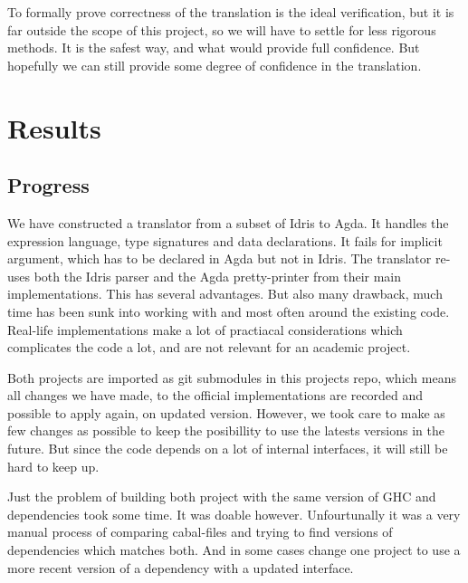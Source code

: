 \documentclass[parskip=half]{scrartcl}
\begin{document}
To formally prove correctness of the translation is the ideal verification, but
it is far outside the scope of this project, so we will have to settle for less
rigorous methods. It is the safest way, and what would provide full confidence.
But hopefully we can still provide some degree of confidence in the
translation.


\section{Results}
\subsection{Progress}

We have constructed a translator from a subset of Idris to Agda. It handles the
expression language, type signatures and data declarations.  It fails for
implicit argument, which has to be declared in Agda but not in Idris. The
translator re-uses both the Idris parser and the Agda pretty-printer from their
main implementations. This has several advantages. But also many drawback, much
time has been sunk into working with and most often around the existing code.
Real-life implementations make a lot of practiacal considerations which
complicates the code a lot, and are not relevant for an academic project.

Both projects are imported as git submodules in this projects repo, which means
all changes we have made, to the official implementations are recorded and
possible to apply again, on updated version. However, we took care to make as
few changes as possible to keep the posibillity to use the latests versions in
the future. But since the code depends on a lot of internal interfaces, it will
still be hard to keep up.

Just the problem of building both project with the same version of GHC and
dependencies took some time. It was doable however. Unfourtunally it was a very
manual process of comparing cabal-files and trying to find versions of
dependencies which matches both. And in some cases change one project to use
a more recent version of a dependency with a updated interface.
\end{document}
